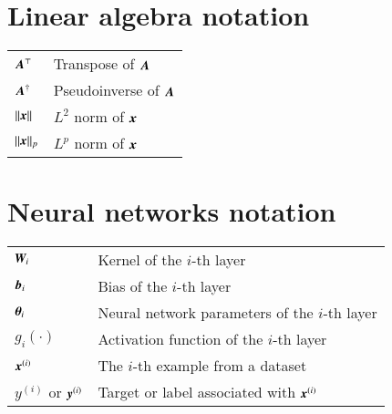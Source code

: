 \section*{Linear algebra notation}

{
    \begin{tabular}{p{2cm}p{12.5cm}}
    ${\bm{A}}^\top$		& Transpose of ${\bm{A}}$ \\
    ${\bm{A}}^\dagger$   & Pseudoinverse of ${\bm{A}}$ \\
    $\|{\bm{x}}\|$       & $L^2$ norm of ${\bm{x}}$\\
    $\|{\bm{x}}\|_p$     & $L^p$ norm of ${\bm{x}}$
    \end{tabular}
}

\section*{Neural networks notation}

{
    \begin{tabular}{p{2cm}p{12.5cm}}
    ${\bm{W}}_i$ & Kernel of the $i$-th layer \\
    ${\bm{b}}_i$ & Bias of the $i$-th layer \\
    ${\bm{\theta}}_i$ & Neural network parameters of the $i$-th layer \\
    $g_i(\cdot)$ & Activation function of the $i$-th layer \\
    ${\bm{x}}^{(i)}$ & The $i$-th example from a dataset \\
    $y^{(i)}$ or ${\bm{y}}^{(i)}$ & Target or label associated with ${\bm{x}}^{(i)}$
    \end{tabular}
}


\newpage